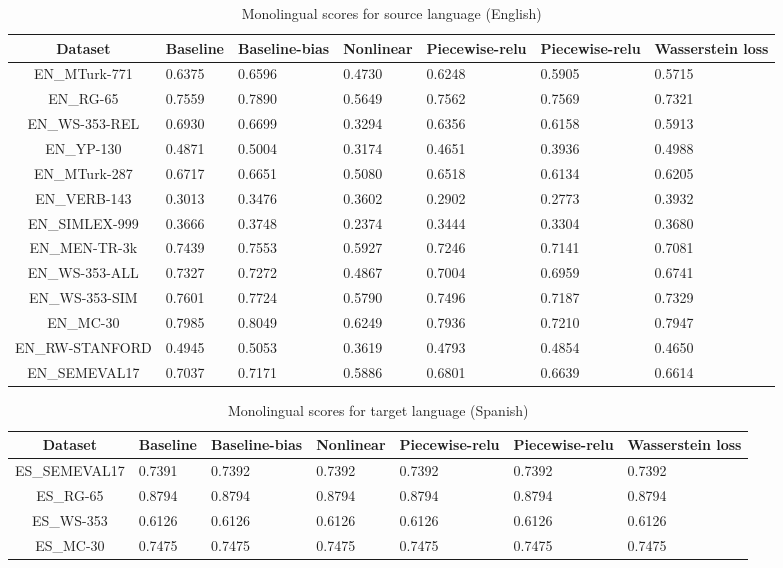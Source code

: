 \documentclass[11pt]{article}
\begin{document}
\begin{table*}[ht]
  \begin{center}
  \begin{tabular}{|c|l|l|l|l|l|l|}
  \hline
  Dataset & Baseline & Baseline-bias & Nonlinear & Piecewise-relu & Piecewise-relu & Wasserstein loss\\
  \hline
  EN\_MTurk-771 & 0.6375 & 0.6596 & 0.4730 & 0.6248 & 0.5905 & 0.5715 \\
  \hline
  EN\_RG-65 & 0.7559 & 0.7890 & 0.5649 & 0.7562 & 0.7569 & 0.7321 \\
  \hline
  EN\_WS-353-REL & 0.6930 & 0.6699 & 0.3294 & 0.6356 & 0.6158 & 0.5913 \\
  \hline
  EN\_YP-130 & 0.4871 & 0.5004 & 0.3174 & 0.4651 & 0.3936 & 0.4988 \\
  \hline
  EN\_MTurk-287 & 0.6717 & 0.6651 & 0.5080 & 0.6518 & 0.6134 & 0.6205 \\
  \hline
  EN\_VERB-143 & 0.3013 & 0.3476 & 0.3602 & 0.2902 & 0.2773 & 0.3932 \\
  \hline
  EN\_SIMLEX-999 & 0.3666 & 0.3748 & 0.2374 & 0.3444 & 0.3304 & 0.3680 \\
  \hline
  EN\_MEN-TR-3k & 0.7439 & 0.7553 & 0.5927 & 0.7246 & 0.7141 & 0.7081 \\
  \hline
  EN\_WS-353-ALL & 0.7327 & 0.7272 & 0.4867 & 0.7004 & 0.6959 & 0.6741 \\
  \hline
  EN\_WS-353-SIM & 0.7601 & 0.7724 & 0.5790 & 0.7496 & 0.7187 & 0.7329 \\
  \hline
  EN\_MC-30 & 0.7985 & 0.8049 & 0.6249 & 0.7936 & 0.7210 & 0.7947 \\
  \hline
  EN\_RW-STANFORD & 0.4945 & 0.5053 & 0.3619 & 0.4793 & 0.4854 & 0.4650 \\
  \hline
  EN\_SEMEVAL17 & 0.7037 & 0.7171 & 0.5886 & 0.6801 & 0.6639 & 0.6614 \\
  \hline
  \end{tabular}
  \end{center}
  \caption{ Monolingual scores for source language (English)}
  \label{monolingual-source}
\end{table*}

\begin{table*}[ht]
  \begin{center}
  \begin{tabular}{|c|l|l|l|l|l|l|}
  \hline
  Dataset & Baseline & Baseline-bias & Nonlinear & Piecewise-relu & Piecewise-relu & Wasserstein loss\\
  \hline
  ES\_SEMEVAL17 & 0.7391 & 0.7392 & 0.7392 & 0.7392 & 0.7392 & 0.7392 \\
  \hline
  ES\_RG-65 & 0.8794 & 0.8794 & 0.8794 & 0.8794 & 0.8794 & 0.8794 \\
  \hline
  ES\_WS-353 & 0.6126 & 0.6126 & 0.6126 & 0.6126 & 0.6126 & 0.6126 \\
  \hline
  ES\_MC-30 & 0.7475 & 0.7475 & 0.7475 & 0.7475 & 0.7475 & 0.7475 \\
  \hline
  \end{tabular}
  \end{center}
  \caption{ Monolingual scores for target language (Spanish)}
  \label{monolingual-target}
\end{table*}
\end{document}
